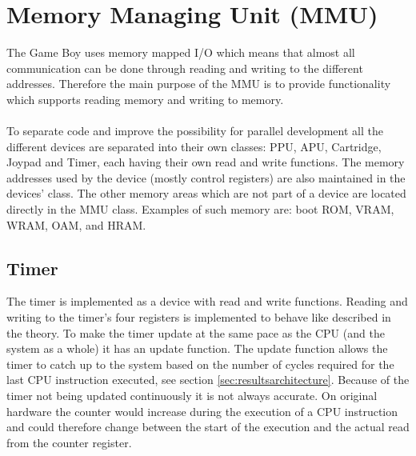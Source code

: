 \section{Memory Managing Unit (MMU)}
The Game Boy uses memory mapped I/O which means that almost all communication can be done through reading and writing to the different addresses. Therefore the main purpose of the MMU is to provide functionality which supports reading memory and writing to memory. 
\\\\
To separate code and improve the possibility for parallel development all the different devices are separated into their own classes: PPU, APU, Cartridge, Joypad and Timer, each having their own read and write functions. 
The memory addresses used by the device (mostly control registers) are also maintained in the devices' class. 
The other memory areas which are not part of a device are located directly in the MMU class. Examples of such memory are: boot ROM, VRAM, WRAM, OAM, and HRAM.

\subsection{Timer}

The timer is implemented as a device with read and write functions. 
Reading and writing to the timer's four registers is implemented to behave like described in the theory.  
To make the timer update at the same pace as the CPU (and the system as a whole) it has an update function. 
The update function allows the timer to catch up to the system based on the number of cycles required for the last CPU instruction executed, see section \ref{sec:resultsarchitecture}.
Because of the timer not being updated continuously it is not always accurate. On original hardware the counter would increase during the execution of a CPU instruction and could therefore change between the start of the execution and the actual read from the counter register.




